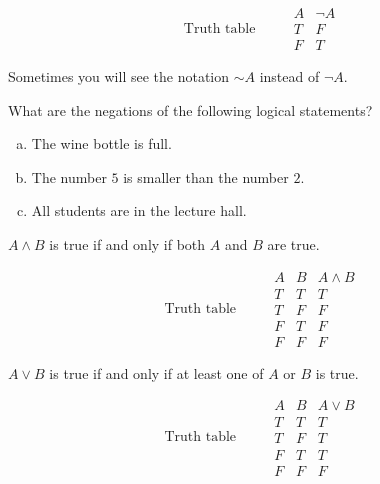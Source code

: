    \begin{equation}
   \mbox{ Truth table }\qquad 
    \begin{array}{c|c}
     A & \neg A\\ \hline
     T & F\\
     F & T
    \end{array}
   \end{equation}

Sometimes you will see the notation $\sim\! A$ instead of $\neg A$.

\begin{example}
What are the negations of the following logical statements?
 	\begin{enumerate}[(a)]
 		\item The wine bottle is full.
 		 \white{2cm}{}
 		\item The number $5$ is smaller than the number $2$.
 		\white{2cm}{}
 		\item All students are in the lecture hall.
 		\white{2cm}{}
 	\end{enumerate}
\end{example}

\begin{definition}
 $A \wedge B$ is true if and only if both $A$  and $B$ are true.
\end{definition}
 
  
   \begin{equation}
   \mbox{ Truth table }\qquad 
    \begin{array}{cc|c}
     A & B & A \wedge B\\ \hline
     T & T& T\\
     T & F & F\\
     F & T & F\\
     F & F & F
    \end{array}
   \end{equation}

\begin{definition}
   $A \vee B$ is true if and only if at least one of  $A$ or $B$ is true.
\end{definition}
 
\begin{equation}
\mbox{ Truth table }\qquad 
 \begin{array}{cc|c}
  A & B & A \vee B \\ \hline
  T & T& T\\
  T & F & T\\
  F & T & T\\
  F & F & F
 \end{array}
\end{equation}
